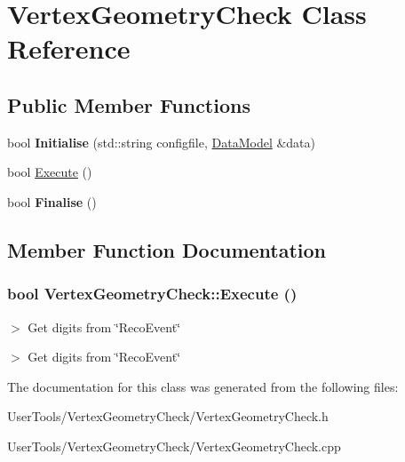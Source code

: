 \hypertarget{classVertexGeometryCheck}{
\section{VertexGeometryCheck Class Reference}
\label{classVertexGeometryCheck}
}
\subsection*{Public Member Functions}
\begin{DoxyCompactItemize}
\item 
\hypertarget{classVertexGeometryCheck_ab3a62750e49d334aa55c80ae8c3137a0}{
bool {\bfseries Initialise} (std::string configfile, \hyperlink{classDataModel}{DataModel} \&data)}
\label{classVertexGeometryCheck_ab3a62750e49d334aa55c80ae8c3137a0}

\item 
bool \hyperlink{classVertexGeometryCheck_a3a568a1ac65e6e9a15fe9ce6fc6404a6}{Execute} ()
\item 
\hypertarget{classVertexGeometryCheck_a47510b0fccddcaf970cb1005822ee47c}{
bool {\bfseries Finalise} ()}
\label{classVertexGeometryCheck_a47510b0fccddcaf970cb1005822ee47c}

\end{DoxyCompactItemize}


\subsection{Member Function Documentation}
\hypertarget{classVertexGeometryCheck_a3a568a1ac65e6e9a15fe9ce6fc6404a6}{
\subsubsection[{Execute}]{\setlength{\rightskip}{0pt plus 5cm}bool VertexGeometryCheck::Execute ()}}
\label{classVertexGeometryCheck_a3a568a1ac65e6e9a15fe9ce6fc6404a6}


$>$ Get digits from \char`\"{}RecoEvent\char`\"{}

$>$ Get digits from \char`\"{}RecoEvent\char`\"{} 

The documentation for this class was generated from the following files:\begin{DoxyCompactItemize}
\item 
UserTools/VertexGeometryCheck/VertexGeometryCheck.h\item 
UserTools/VertexGeometryCheck/VertexGeometryCheck.cpp\end{DoxyCompactItemize}
